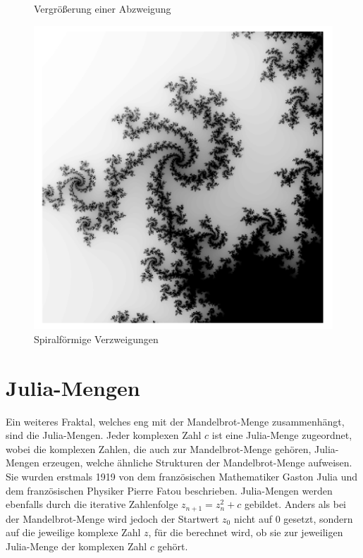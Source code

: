 \begin{figure}[H]
  \caption{\newline Vergrößerung einer \newline Abzweigung}\label{fig:mandelbrot-zoomed}
  \endminipage\hfill
  \includegraphics[width=\linewidth]{img/MandelbrotSpirals.pdf}
  \caption{\newline Spiralförmige \newline Verzweigungen}\label{fig:mandelbrot-spirals}
  \endminipage
\end{figure}

\section{Julia-Mengen}
Ein weiteres Fraktal, welches eng mit der Mandelbrot-Menge zusammenhängt, sind
die Julia-Mengen. Jeder komplexen Zahl $c$ ist eine Julia-Menge zugeordnet,
wobei die komplexen Zahlen, die auch zur Mandelbrot-Menge gehören, Julia-Mengen
erzeugen, welche ähnliche Strukturen der Mandelbrot-Menge aufweisen. \newline
Sie wurden erstmals 1919 von dem französischen Mathematiker Gaston Julia und
dem französischen Physiker Pierre Fatou beschrieben. \cite{JuliaMen20:online}\cite{Juliamen90:online} \hfill \break \newline
Julia-Mengen werden ebenfalls durch die iterative Zahlenfolge $z_{n+1} =
  z_{n}^{2}+ c$ gebildet. Anders als bei der Mandelbrot-Menge wird jedoch der
Startwert $z_{0}$ nicht auf 0 gesetzt, sondern auf die jeweilige komplexe Zahl
$z$, für die berechnet wird, ob sie zur jeweiligen Julia-Menge der komplexen
Zahl $c$ gehört. \newline


